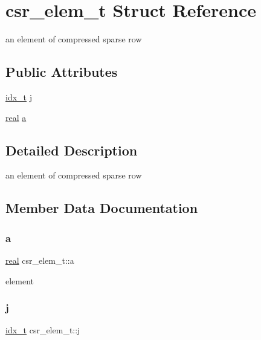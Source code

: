 \hypertarget{structcsr__elem__t}{}\section{csr\+\_\+elem\+\_\+t Struct Reference}
\label{structcsr__elem__t}


an element of compressed sparse row  


\subsection*{Public Attributes}
\begin{DoxyCompactItemize}
\item 
\hyperlink{spmv_8cc_a8e93478a00e685bea5e6a3f617bf03a3}{idx\+\_\+t} \hyperlink{structcsr__elem__t_a4525598ab26d6263b2242cc33511ca7f}{j}
\item 
\hyperlink{spmv_8cc_a11d147c64891830c9e79b3315b1b2e21}{real} \hyperlink{structcsr__elem__t_a55e480eefa495ee8b6e359a5f5a94a4f}{a}
\end{DoxyCompactItemize}


\subsection{Detailed Description}
an element of compressed sparse row 

\subsection{Member Data Documentation}
\mbox{\label{structcsr__elem__t_a55e480eefa495ee8b6e359a5f5a94a4f}} 
\subsubsection{\texorpdfstring{a}{a}}
{\footnotesize\ttfamily \hyperlink{spmv_8cc_a11d147c64891830c9e79b3315b1b2e21}{real} csr\+\_\+elem\+\_\+t\+::a}

element \mbox{\label{structcsr__elem__t_a4525598ab26d6263b2242cc33511ca7f}} 
\subsubsection{\texorpdfstring{j}{j}}
{\footnotesize\ttfamily \hyperlink{spmv_8cc_a8e93478a00e685bea5e6a3f617bf03a3}{idx\+\_\+t} csr\+\_\+elem\+\_\+t\+::j}

